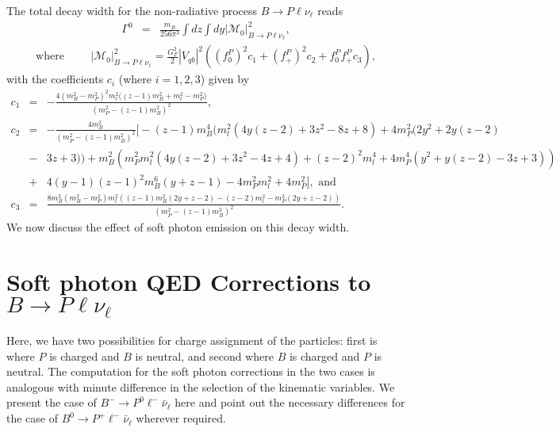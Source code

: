 \documentclass[a4paper,11pt]{article}
\begin{document}
The total decay width for the non-radiative process $B\rightarrow P \ell \nu_\ell$ reads
	\begin{eqnarray}
		\Gamma^{0}&=& \frac{m_{B}}{256 \pi^{3}}\int dz \int dy \left|\mathcal{M}_0\right|_{B\to P \ell \nu_{\ell}}^{2},
		\label{nondefde}
	\end{eqnarray}
		\begin{eqnarray}
		\text{where}\hspace{1cm}
	\left|\mathcal{M}_0\right|_{B\to P \ell \nu_{\ell}}^{2}= \frac{G_{F}^{2}}{2}\left|V_{qb}\right|^{2}\left((f_{0}^{P})^{2} c_{1} + (f_{+}^{P})^{2} c_{2} + f_{0}^{P}f_{+}^{P} c_{3}\right),
	\end{eqnarray}
	with the coefficients $c_i$ (where $i=1,2,3$) given by
	\begin{eqnarray}
	c_{1}&=& -\frac{4(m_{B}^{2}-m_{P}^{2})^{2}m_{l}^{2}\Big((z-1)m_{B}^{2}+m_{l}^{2}-m_{P}^{2}\Big)}{(m_{P}^{2}-(z-1)m_{B}^{2})^{2}},\nonumber\\
		c_{2}&=& -\frac{4m_{B}^{2}}{(m_{P}^{2}-(z-1)m_{B}^{2})^{2}}\Bigg[-(z-1)m_{B}^{4}\Big(m_{l}^{2}(4y(z-2)+3z^{2}-8z+8)+4 m_{P}^{2}(2 y^{2}+2 y (z-2)\nonumber \\ 
	&-& 3z+3)\Big)+m_{B}^2(m_{P}^{2}m_{l}^{2}(4y(z-2)+3z^{2}-4z+4)+(z-2)^{2}m_{l}^{4}+4 m_{P}^{4}(y^{2}+y(z-2) -3 z + 3)) \nonumber\\ 
	&+& 4(y-1)(z-1)^{2}m_{B}^{6} (y+z-1) - 4 m_{P}^{2} m_{l}^{2}+ 4 m_{P}^{2}\Bigg], \text{  and}\nonumber\\
	c_{3}&=&\frac{8m_{B}^{2}(m_{B}^{2}-m_{P}^{2})m_{l}^{2}\left((z-1)m_{B}^{2}(2y+z-2)-(z-2)m_{l}^{2}-m_{P}^{2}(2y +z-2)\right)}{(m_{P}^{2}-(z-1)m_{B}^{2})^{2}}.
	\end{eqnarray}
	 We now discuss the effect of soft photon emission on this decay width.
    	\section{Soft photon QED Corrections to $B \rightarrow P \ell \nu_\ell$}
	\label{sec3}
 Here, we have two possibilities for charge assignment  of the particles: first is where $P$ is charged and $B$ is neutral, and second where $B$ is charged and $P$ is neutral. The computation for the soft photon corrections in the two cases is analogous with minute difference in the selection of the kinematic variables. We present the case of $B^- \rightarrow P^0 \ell^- \bar{\nu}_\ell$ here and point out the necessary differences for the case of $B^0 \rightarrow P^+ \ell^- \bar{\nu}_\ell$ wherever required.
\end{document}
